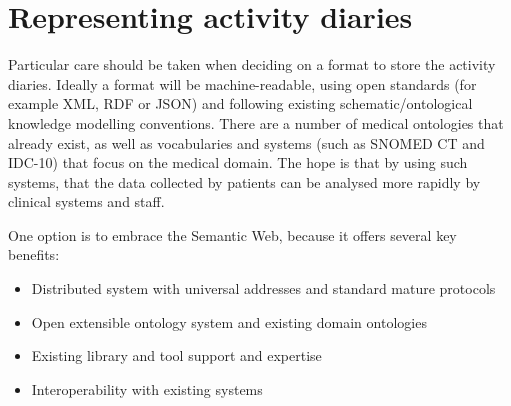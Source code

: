 \documentclass{chi-ext}
\begin{document}


\section{Representing activity diaries}

Particular care should be taken when deciding on a format to store the activity diaries. Ideally
a format will be machine-readable, using open standards (for example XML, RDF or JSON) and
following existing schematic/ontological knowledge modelling conventions. There are a 
number of medical ontologies that already exist, as well as vocabularies and systems (such as
SNOMED CT \cite{stearns2001snomed} and IDC-10) that focus on the medical domain. The hope is that by using
such systems, that the data collected by patients can be analysed more rapidly by clinical systems
and staff.

One option is to embrace the Semantic Web, because it offers several key benefits:

\begin{itemize}

\item Distributed system with universal addresses and standard mature protocols
\item Open extensible ontology system and existing domain ontologies
\item Existing library and tool support and expertise
\item Interoperability with existing systems

\end{itemize}
 
\end{document}
